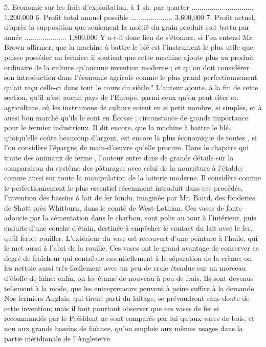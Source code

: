 5. Economie sur les frais d'exploitation, à 1 sh. par quarter ............................... 1,200,000
6. Profit total annuel possible ..................... 3,600,000
7. Profit actuel, d'après la supposition que seulement la moitié du grain produit soit battu par année ..................... 1,800,000
Y a-t-il donc lieu de s'étonner, si l'on\setcounter{page}{418} entend Mr. Brown affirmer, que la machine à battre le blé est l'instrument le plus utile que puisse posséder un fermier: il soutient que cette machine ajoute plus au produit ordinaire de la culture qu'aucune invention moderne ; et qu'on doit considérer son introduction dans l'économie agricole comme le plus grand perfectionnement qu'ait reçu celle-ci dans tout le cours du siècle."
L'auteur ajoute, à la fin de cette section, qu'il n'est aucun pays de l'Europe, parmi ceux qu'on peut citer en agriculture, où les instrumens de culture soient en si petit nombre, si simples, et à aussi bon marché qu'ils le sont en Écosse ; circonstance de grande importance pour le fermier industrieux. Il dit encore, que la machine à battre le blé, quoiqu'elle coûte beaucoup d'argent, est encore la plus économique de toutes , si l'on considère l'épargne de main-d'œuvre qu'elle procure.
Dans le chapitre qui traite des animaux de ferme , l'auteur entre dans de grands détails sur la comparaison du système des pâturages avec celui de la nourriture à l'étable; comme aussi sur toute la manipulation de la laiterie moderne. Il considère comme le perfectionnement le plus essentiel récemment introduit dans ces procédés, l'invention des\setcounter{page}{419} bassins à lait de fer fondu, imaginée par Mr. Baird, des fonderies de Shott près Whitburn, dans le comté de West-Lothian. Ces vases de fonte adoucie par la cémentation dans le charbon, sont polis au tour à l'intérieur, puis enduits d'une couche d'étain, destinée à empêcher le contact du lait avec le fer, qu'il feroit rouiller. L'extérieur du vase est recouvert d'une peinture à l'huile, qui le met aussi à l'abri de la rouille. Ces vases ont le grand avantage de conserver ce degré de fraîcheur qui contribue essentiellement à la séparation de la crème; on les nettoie aussi très-facilement avec un peu de craie étendue sur un morceau d'étoffe de laine; enfin, on les étame de nouveau à peu de frais. Ils sont devenus tellement à la mode, que les entrepreneurs peuvent à peine suffire à la demande. Nos fermiers Anglais, qui tirent parti du laitage, se prévaudront sans doute de cette invention; mais il faut pourtant observer que ces vases de fer si recommandés par le Président ne sont comparés par lui qu'aux vases de bois, et non aux grands bassins de faïance, qu'on emploie aux mêmes usages dans la partie méridionale de l'Angleterre.
